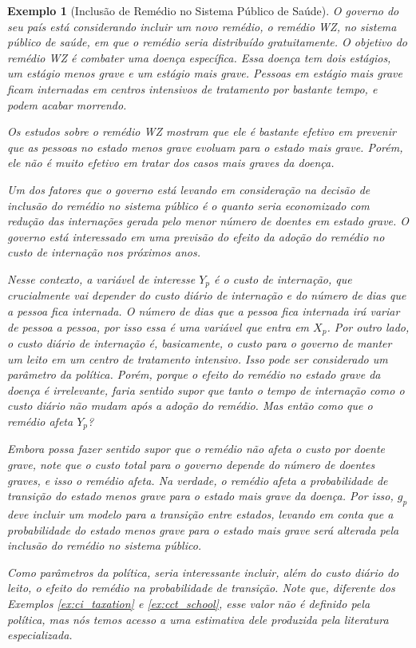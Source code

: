 \documentclass[12pt, a4paper, openany]{book}
\numberwithin{equation}{chapter}
\numberwithin{table}{chapter}
\numberwithin{figure}{chapter}
\theoremstyle{break}
\newtheorem{exemplo}{Exemplo}
\begin{document}
\begin{exemplo}[Inclusão de Remédio no Sistema Público de Saúde]
\label{ex:sick_sicker}
O governo do seu país está considerando incluir um novo remédio, o remédio WZ, no sistema público de saúde, em que o remédio seria distribuído gratuitamente. O objetivo do remédio WZ é combater uma doença específica. Essa doença tem dois estágios, um estágio menos grave e um estágio mais grave. Pessoas em estágio mais grave ficam internadas em centros intensivos de tratamento por bastante tempo, e podem acabar morrendo. 

Os estudos sobre o remédio WZ mostram que ele é bastante efetivo em prevenir que as pessoas no estado menos grave evoluam para o estado mais grave. Porém, ele não é muito efetivo em tratar dos casos mais graves da doença.

Um dos fatores que o governo está levando em consideração na decisão de inclusão do remédio no sistema público é o quanto seria economizado com redução das internações gerada pelo menor número de doentes em estado grave. O governo está interessado em uma previsão do efeito da adoção do remédio no custo de internação nos próximos anos. 

Nesse contexto, a variável de interesse $Y_p$ é o custo de internação, que crucialmente vai depender do custo diário de internação e do número de dias que a pessoa fica internada. O número de dias que a pessoa fica internada irá variar de pessoa a pessoa, por isso essa é uma variável que entra em $X_p$. Por outro lado, o custo diário de internação é, basicamente, o custo para o governo de manter um leito em um centro de tratamento intensivo. Isso pode ser considerado um parâmetro da política. Porém, porque o efeito do remédio no estado grave da doença é irrelevante, faria sentido supor que tanto o tempo de internação como o custo diário não mudam após a adoção do remédio. Mas então como que o remédio afeta $Y_p$?

Embora possa fazer sentido supor que o remédio não afeta o custo por doente grave, note que o custo total para o governo depende do número de doentes graves, e isso o remédio afeta. Na verdade, o remédio afeta a probabilidade de transição do estado menos grave para o estado mais grave da doença. Por isso, $g_p$ deve incluir um modelo para a transição entre estados, levando em conta que a probabilidade do estado menos grave para o estado mais grave será alterada pela inclusão do remédio no sistema público. 

Como parâmetros da política, seria interessante incluir, além do custo diário do leito, o efeito do remédio na probabilidade de transição. Note que, diferente dos Exemplos \ref{ex:ci_taxation} e \ref{ex:cct_school}, esse valor não é definido pela política, mas nós temos acesso a uma estimativa dele produzida pela literatura especializada.


\end{exemplo}
\end{document}
